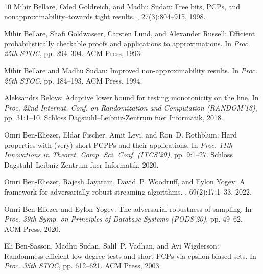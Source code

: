 \documentclass[11pt]{article}
\numberwithin{equation}{section}
\theoremstyle{definition}
\theoremstyle{plain}
\begin{document}
\begin{thebibliography}{10}
{\sc Mihir Bellare, Oded Goldreich, and Madhu Sudan}: Free bits, {PCP}s, and
  nonapproximability--towards tight results.
, 27(3):804--915, 1998.
\newblock [\epfmtdoi{10.1137/S0097539796302531}]

{\sc Mihir Bellare, Shafi Goldwasser, Carsten Lund, and Alexander Russell}:
  Efficient probabilistically checkable proofs and applications to
  approximations.
\newblock In {\em Proc. 25th STOC}, pp. 294--304. ACM Press, 1993.
\newblock [\epfmtdoi{10.1145/167088.167174}]

{\sc Mihir Bellare and Madhu Sudan}: Improved non-approximability results.
\newblock In {\em Proc. 26th STOC}, pp. 184--193. ACM Press, 1994.
\newblock [\epfmtdoi{10.1145/195058.195129}]

{\sc Aleksandrs Belovs}: Adaptive lower bound for testing monotonicity on the
  line.
\newblock In {\em Proc. 22nd Internat. Conf. on Randomization and Computation
  (RANDOM'18)}, pp. 31:1--10. Schloss Dagstuhl--Leibniz-Zentrum fuer
  Informatik, 2018.

{\sc Omri Ben{-}Eliezer, Eldar Fischer, Amit Levi, and Ron~D. Rothblum}: Hard
  properties with (very) short {PCPP}s and their applications.
\newblock In {\em Proc. 11th Innovations in Theoret. Comp. Sci. Conf.
  (ITCS'20)}, pp. 9:1--27. Schloss Dagstuhl--Leibniz-Zentrum fuer Informatik,
  2020.

{\sc Omri Ben{-}Eliezer, Rajesh Jayaram, David~P. Woodruff, and Eylon Yogev}: A
  framework for adversarially robust streaming algorithms.
, 69(2):17:1--33, 2022.
\newblock [\epfmtdoi{10.1145/3498334}]

{\sc Omri Ben{-}Eliezer and Eylon Yogev}: The adversarial robustness of
  sampling.
\newblock In {\em Proc. 39th Symp. on Principles of Database Systems
  (PODS'20)}, pp. 49--62. ACM Press, 2020.
\newblock [\epfmtdoi{10.1145/3375395.3387643}]

{\sc Eli Ben{-}Sasson, Madhu Sudan, Salil~P. Vadhan, and Avi Wigderson}:
  Randomness-efficient low degree tests and short {PCP}s via epsilon-biased
  sets.
\newblock In {\em Proc. 35th STOC}, pp. 612--621. ACM Press, 2003.
\newblock [\epfmtdoi{10.1145/780542.780631}]


\end{thebibliography}
\end{document}
